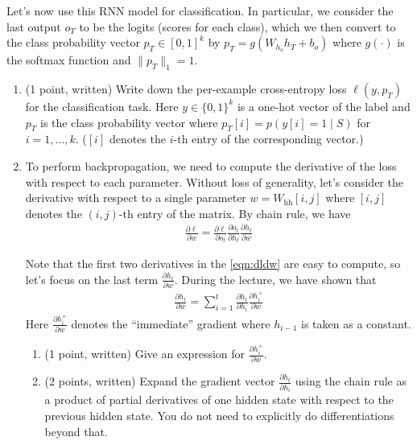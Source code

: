 \documentclass{article}
\theoremstyle{case}
\theoremstyle{definition}
\begin{document}
 Let's now use this RNN model for classification.
 In particular, we consider the last output $o_T$ to be the logits (scores for each class), which we then convert to the class probability vector $p_T\in[0,1]^{k}$ by $p_T=g(W_{h_o}h_T+b_o)$ where $g(\cdot)$ is the softmax function and $\|p_T\|_1=1$.
 



\begin{enumerate}
    \item (1 point, written) Write down the per-example cross-entropy loss $\ell(y, p_T)$ for the classification task. Here $y\in\{0,1\}^k$ is a one-hot vector of the label and  $p_T$ is the class probability vector where $p_T[i] = p(y[i]=1\mid S)$ for $i=1,\ldots, k$. ($[i]$ denotes the $i$-th entry of the corresponding vector.)
    
    \newpage
    \item 
    To perform backpropagation, we need to compute the derivative of the loss with respect to each parameter.
    Without loss of generality, let's consider the derivative with respect to a single parameter $w=W_{\text{hh}}[i,j]$ where $[i,j]$ denotes the $(i,j)$-th entry of the matrix. By chain rule, we have
    \begin{align}
        \frac{\partial\ell}{\partial w} = \frac{\partial\ell}{\partial o_t}
    \frac{\partial o_t}{\partial h_t}
    \frac{\partial h_t}{\partial w}
    \label{eqn:dldw}
    \end{align}
    
    Note that the first two derivatives in the \ref{eqn:dldw} are easy to compute,
    so let's focus on the last term $\frac{\partial h_t}{\partial w}$.
    During the lecture, we have shown that
    \begin{align}
        \frac{\partial h_t}{\partial w} = \sum_{i=1}^t \frac{\partial h_t}{\partial h_i} \frac{\partial h_i^+}{\partial w}\label{eqn:dhdw}
    \end{align}
    Here $\frac{\partial h_i^+}{\partial w}$ denotes the ``immediate'' gradient where $h_{i-1}$ is taken as a constant.

    \begin{enumerate}
        \item (1 point, written)
        Give an expression for $\frac{\partial h_i^+}{\partial w}$.

        \newpage
        \item (2 points, written)
        Expand the gradient vector $\frac{\partial h_t}{\partial h_i}$ using the chain rule as a product of partial derivatives of one hidden state with respect to the previous hidden state. You do not need to explicitly do differentiations beyond that. 


\end{enumerate}
\end{enumerate}
\end{document}
